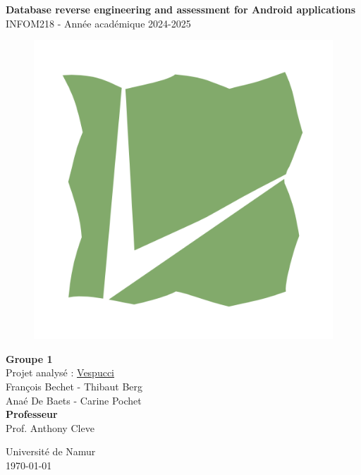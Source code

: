 \documentclass[a4paper,11pt]{article}
\begin{document}
\begin{titlepage}
    \begin{center}
        \vspace*{2cm}
        \Huge\textbf{Database reverse engineering and assessment for
            Android applications}\\
        \vspace{1cm}
        \Large INFOM218 - Année académique 2024-2025\\
        \begin{figure}[!ht]
            \centering
            \includegraphics[scale=0.2]{images/vespucci.png}
            \label{fig:logo-vespucci}
        \end{figure}
        {\Large\textbf{Groupe 1}}\\
        {Projet analysé : \href{https://github.com/MarcusWolschon/osmeditor4android/tree/master}{Vespucci}}\\
        \vspace{0.5cm}
        {\Large François Bechet - Thibaut Berg}\\
        Anaé De Baets - Carine Pochet\\
        \vspace{1cm}
        {\Large\textbf{Professeur}}\\
        {\Large Prof. Anthony Cleve}\\
        \vfill
        \begin{figure}[!ht]
            \centering
            
            \label{fig:logo-unamur}
        \end{figure}
        \Large Université de Namur\\
        \Large \today
    \end{center}
\end{titlepage}

\tableofcontents
\newpage


\newpage

\newpage

\newpage

\newpage
\end{document}
